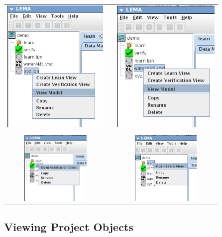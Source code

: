 \documentclass[titlepage,11pt]{article}
\begin{document}
\begin{center}
\begin{tabular}{ccc}
\includegraphics[height=65mm]{screenshots/modLHPN} & &
\includegraphics[height=65mm]{screenshots/modVHDL} \\ \\
\includegraphics[height=35mm]{screenshots/modVerify} & &
\includegraphics[height=35mm]{screenshots/modLearnLema}
\end{tabular}
\end{center}

\subsection{Viewing Project Objects}
\end{document}
